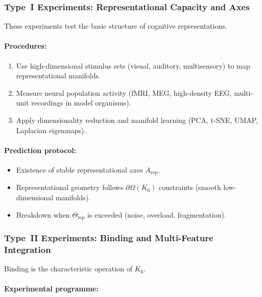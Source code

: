 \subsubsection{Type~I Experiments: Representational Capacity and Axes}

These experiments test the basic structure of cognitive
representations.

\paragraph{Procedures:}

\begin{enumerate}
    \item Use high-dimensional stimulus sets (visual, auditory,
          multisensory) to map representational manifolds.
    \item Measure neural population activity (fMRI, MEG, high-density EEG,
          multi-unit recordings in model organisms).
    \item Apply dimensionality reduction and manifold learning
          (PCA, t-SNE, UMAP, Laplacian eigenmaps).
\end{enumerate}

\paragraph{Prediction protocol:}

\begin{itemize}
    \item Existence of stable representational axes $A_{\mathrm{rep}}$.
    \item Representational geometry follows $\partial\Omega(K_6)$
          constraints (smooth low-dimensional manifolds).
    \item Breakdown when $\Theta_{\mathrm{rep}}$ is exceeded
          (noise, overload, fragmentation).
\end{itemize}



\subsubsection{Type~II Experiments: Binding and Multi-Feature Integration}

Binding is the characteristic operation of $K_6$.

\paragraph{Experimental programme:}

